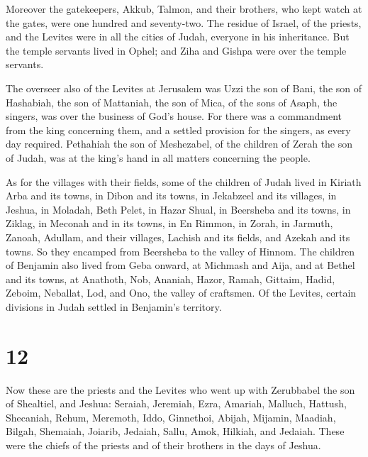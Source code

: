  Moreover the gatekeepers, Akkub, Talmon, and their
brothers, who kept watch at the gates, were one hundred and seventy-two.
 The residue of Israel, of the priests, and the Levites
were in all the cities of Judah, everyone in his inheritance.
 But the temple servants lived in Ophel; and Ziha and
Gishpa were over the temple servants.

 The overseer also of the Levites at Jerusalem was Uzzi
the son of Bani, the son of Hashabiah, the son of Mattaniah, the son of
Mica, of the sons of Asaph, the singers, was over the business of God's
house.  For there was a commandment from the king
concerning them, and a settled provision for the singers, as every day
required.  Pethahiah the son of Meshezabel, of the
children of Zerah the son of Judah, was at the king's hand in all
matters concerning the people.

 As for the villages with their fields, some of the
children of Judah lived in Kiriath Arba and its towns, in Dibon and its
towns, in Jekabzeel and its villages,  in Jeshua, in
Moladah, Beth Pelet,  in Hazar Shual, in Beersheba and
its towns,  in Ziklag, in Meconah and in its towns,
 in En Rimmon, in Zorah, in Jarmuth, 
Zanoah, Adullam, and their villages, Lachish and its fields, and Azekah
and its towns. So they encamped from Beersheba to the valley of Hinnom.
 The children of Benjamin also lived from Geba onward, at
Michmash and Aija, and at Bethel and its towns,  at
Anathoth, Nob, Ananiah,  Hazor, Ramah, Gittaim,
 Hadid, Zeboim, Neballat,  Lod, and Ono,
the valley of craftsmen.  Of the Levites, certain
divisions in Judah settled in Benjamin's territory.

\hypertarget{section-11}{%
\section{12}\label{section-11}}

 Now these are the priests and the Levites who went up
with Zerubbabel the son of Shealtiel, and Jeshua: Seraiah, Jeremiah,
Ezra,  Amariah, Malluch, Hattush, 
Shecaniah, Rehum, Meremoth,  Iddo, Ginnethoi, Abijah,
 Mijamin, Maadiah, Bilgah,  Shemaiah,
Joiarib, Jedaiah,  Sallu, Amok, Hilkiah, and Jedaiah.
These were the chiefs of the priests and of their brothers in the days
of Jeshua.


